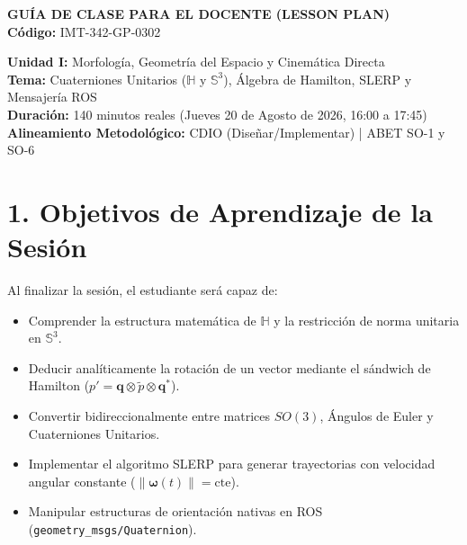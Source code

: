 \documentclass[11pt, a4paper]{article}
\begin{document}
\begin{center}
    \Large\textbf{\textcolor{ucbblue}{GUÍA DE CLASE PARA EL DOCENTE (LESSON PLAN)}}\\
    \vspace{0.2cm}
    \normalsize\textbf{Código:} IMT-342-GP-0302
\end{center}
\vspace{0.3cm}

\noindent\textbf{Unidad I:} Morfología, Geometría del Espacio y Cinemática Directa \\
\textbf{Tema:} Cuaterniones Unitarios ($\mathbb{H}$ y $\mathbb{S}^3$), Álgebra de Hamilton, SLERP y Mensajería ROS \\
\textbf{Duración:} 140 minutos reales (Jueves 20 de Agosto de 2026, 16:00 a 17:45) \\
\textbf{Alineamiento Metodológico:} CDIO (Diseñar/Implementar) | ABET SO-1 y SO-6

\section*{1. Objetivos de Aprendizaje de la Sesión}
Al finalizar la sesión, el estudiante será capaz de:
\begin{itemize}[label=\textcolor{ucbblue}{$\circ$}]
    \item Comprender la estructura matemática de $\mathbb{H}$ y la restricción de norma unitaria en $\mathbb{S}^3$.
    \item Deducir analíticamente la rotación de un vector mediante el sándwich de Hamilton ($p' = \mathbf{q} \otimes \tilde{p} \otimes \mathbf{q}^*$).
    \item Convertir bidireccionalmente entre matrices $SO(3)$, Ángulos de Euler y Cuaterniones Unitarios.
    \item Implementar el algoritmo SLERP para generar trayectorias con velocidad angular constante ($\left\|\boldsymbol{\omega}(t)\right\| = \text{cte}$).
    \item Manipular estructuras de orientación nativas en ROS (\texttt{geometry\_msgs/Quaternion}).
\end{itemize}
\end{document}
